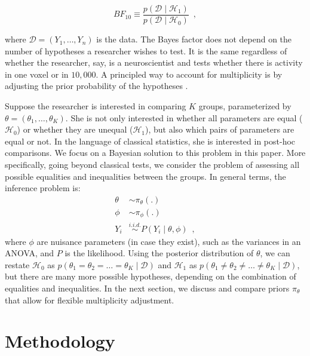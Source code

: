 \documentclass[11pt,a4paper]{article}
\theoremstyle{definition} %
\theoremstyle{case}
\begin{document}
\begin{equation}
    BF_{10} \equiv \frac{p(\mathcal{D} \mid \mathcal{H}_1)}{p(\mathcal{D} \mid \mathcal{H}_0)} \enspace ,
\end{equation}

where $\mathcal{D} = (Y_1, \ldots, Y_n)$ is the data. The Bayes factor does not depend on the number of hypotheses a researcher wishes to test. It is the same regardless of whether the researcher, say, is a neuroscientist and tests whether there is activity in one voxel or in $10,000$. A principled way to account for multiplicity is by adjusting the prior probability of the hypotheses \parencite[e.g.,][]{jeffreys1961theory, westfall1997bayesian}.

Suppose the researcher is interested in comparing $K$ groups, parameterized by $\theta = (\theta_1, \ldots, \theta_K)$. She is not only interested in whether all parameters are equal ($\mathcal{H}_0$) or whether they are unequal ($\mathcal{H}_1$), but also which pairs of parameters are equal or not. In the language of classical statistics, she is interested in post-hoc comparisons. We focus on a Bayesian solution to this problem in this paper. More specifically, going beyond classical tests, we consider the problem of assessing all possible equalities and inequalities between the groups. In general terms, the inference problem is:
\begin{align*}
    \theta &\sim \pi_{\theta}(.) \\
    \phi &\sim \pi_{\phi}(.) \\
    Y_i &\overset{i.i.d.}{\sim} P(Y_i \mid \theta, \phi)  \enspace ,
\end{align*}
where $\phi$ are nuisance parameters (in case they exist), such as the variances in an ANOVA, and $P$ is the likelihood. Using the posterior distribution of $\theta$, we can restate $\mathcal{H}_0$ as $p(\theta_1 = \theta_2 = \ldots = \theta_K \mid \mathcal{D})$ and $\mathcal{H}_1$ as $p(\theta_1 \neq \theta_2 \neq \ldots \neq \theta_K \mid \mathcal{D})$, but there are many more possible hypotheses, depending on the combination of equalities and inequalities. In the next section, we discuss and compare priors $\pi_{\theta}$ that allow for flexible multiplicity adjustment.


\section{Methodology}
\end{document}
